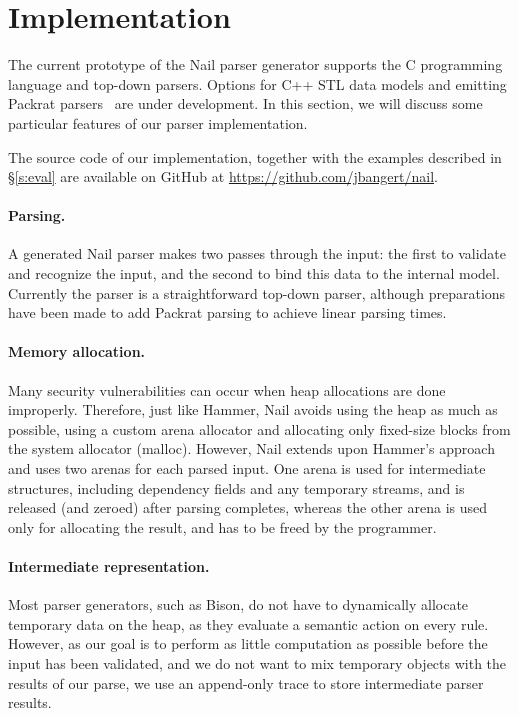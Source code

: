 \section{Implementation}
\label{s:impl}

The current prototype of the Nail parser generator supports the C programming
language and top-down parsers. Options for C++ STL data models and emitting
Packrat parsers~\cite{packrat-parsing:icfp02} are under development. In
this section, we will discuss some particular features of our parser
implementation.

The source code of our implementation, together with the examples described in
\S\ref{s:eval} are available on GitHub at \url{https://github.com/jbangert/nail}.


\paragraph{Parsing.}

A generated Nail parser makes two passes through the input: the first to
validate and recognize the input, and the second to bind this data to the internal
model. Currently the parser is a straightforward top-down parser, although
preparations have been made to add Packrat parsing to achieve linear parsing
times.

\paragraph{Memory allocation.}

Many security vulnerabilities can occur when heap allocations are done improperly. Therefore, just
like Hammer, Nail avoids using the heap as much as possible, using a custom arena allocator and
allocating only fixed-size blocks from the system allocator (malloc). However, Nail extends upon
Hammer's approach and uses two arenas for each parsed input. One arena is used for intermediate
structures, including dependency fields and any temporary streams, and is released (and zeroed)
after parsing completes, whereas the other arena is used only for allocating the result, and has to
be freed by the programmer.

\paragraph{Intermediate representation.}

Most parser generators, such as Bison, do not have to dynamically allocate temporary data on the
heap, as they evaluate a semantic action on every rule. However, as our goal is to perform as little
computation as possible before the input has been validated, and we do not want to mix temporary
objects with the results of our parse, we use an append-only trace to store intermediate parser
results.

